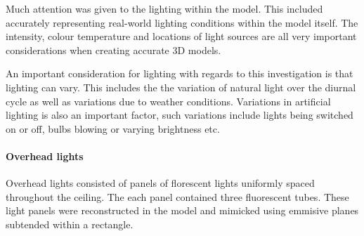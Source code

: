 \documentclass[11pt,a4paper]{report}
\begin{document}
				Much attention was given to the lighting within the model. This included accurately representing real-world lighting conditions within the model itself. The intensity, colour temperature and locations of light sources are all very important considerations when creating accurate 3D models.
				
				An important consideration for lighting with regards to this investigation is that lighting can vary. This includes the the variation of natural light over the diurnal cycle as well as variations due to weather conditions. Variations in artificial lighting is also an important factor, such variations include lights being switched on or off, bulbs blowing or varying brightness etc.
				
				\paragraph{Overhead lights}
					Overhead lights consisted of panels of florescent lights uniformly spaced throughout the ceiling. The each panel contained three fluorescent tubes. These light panels were reconstructed in the model and mimicked using emmisive planes subtended within a rectangle.
					
\end{document}
